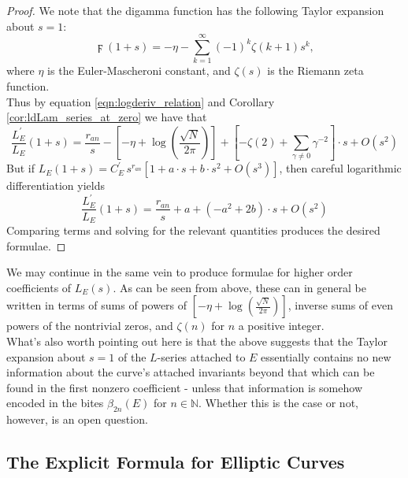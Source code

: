 \documentclass[10pt]{article}
\newcommand{\NN}{\mathbb{N}}
\newcommand{\pr}{^{\prime}}
\newcommand{\ldLe}[1]{\frac{L_E\pr}{L_E}\left(#1\right)}
\begin{document}
\begin{proof}
We note that the digamma function has the following Taylor expansion about $s=1$:
\begin{equation}
\digamma(1+s) = -\eta - \sum_{k=1}^{\infty} (-1)^k \zeta(k+1) s^k,
\end{equation}
where $\eta$ is the Euler-Mascheroni constant, and $\zeta(s)$ is the Riemann zeta function. \\
Thus by equation \ref{eqn:logderiv_relation} and Corollary \ref{cor:ldLam_series_at_zero} we have that
\begin{equation*}
\ldLe{1+s} = \frac{r_{an}}{s} - \left[-\eta + \log\left(\frac{\sqrt{N}}{2\pi}\right)\right] + \left[-\zeta(2) + \sum_{\gamma\ne0} \gamma^{-2}\right]\cdot s + O(s^2)
\end{equation*}
But if $L_E(1+s) = C_E\pr \, s^{r_{an}}\left[1 + a\cdot s + b\cdot s^2 + O(s^3)\right]$, then careful logarithmic differentiation yields
\begin{equation*}
\ldLe{1+s} = \frac{r_{an}}{s} + a + \left(-a^2 + 2b\right)\cdot s + O(s^2)
\end{equation*}
Comparing terms and solving for the relevant quantities produces the desired formulae.
\end{proof}
We may continue in the same vein to produce formulae for higher order coefficients of $L_E(s)$. As can be seen from above, these can in general be written in terms of sums of powers of $\left[-\eta + \log\left(\frac{\sqrt{N}}{2\pi}\right)\right]$, inverse sums of even powers of the nontrivial zeros, and $\zeta(n)$ for $n$ a positive integer. \\

What's also worth pointing out here is that the above suggests that the Taylor expansion about $s=1$ of the $L$-series attached to $E$ essentially contains no new information about the curve's attached invariants beyond that which can be found in the first nonzero coefficient - unless that information is somehow encoded in the bites $\beta_{2n}(E)$ for $n \in \NN$. Whether this is the case or not, however, is an open question.


\newpage
\subsection{The Explicit Formula for Elliptic Curves}
\end{document}
